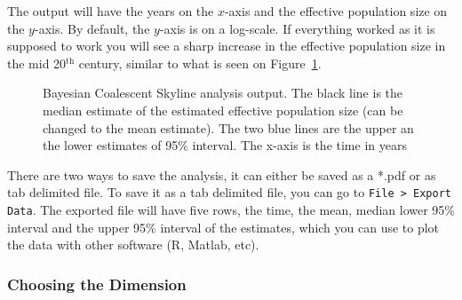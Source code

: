 \documentclass[11pt]{article}
\newcommand{\fixme}[1]{\textcolor{red}{\texttt{{\bf FIX ME:} #1}}}
\begin{document}
The output will have the years on the $x$-axis and the effective population size on the $y$-axis. By default, the $y$-axis is on a log-scale. If everything worked as it is supposed to work you will see a sharp increase in the effective population size in the mid 20$^{\mathrm{th}}$ century, similar to what is seen on Figure~\ref{fig:skyline}.


\begin{figure}[h!]
\centering
{}
\caption{\small Bayesian Coalescent Skyline analysis output. The black line is the median estimate of the estimated effective population size (can be changed to the mean estimate). The two blue lines are the upper an the lower estimates of 95$\%$ interval. The x-axis is the time in years}
\label{fig:skyline}
\end{figure}

There are two ways to save the analysis, it can either be saved as a *.pdf or as tab delimited file. To save it as a tab delimited file, you can go to \texttt{File > Export Data}. The exported file will have five rows, the time, the mean, median lower 95$\%$ interval and the upper 95$\%$ interval of the estimates, which you can use to plot the data with other software (R, Matlab, etc).


\bigskip
\subsubsection{Choosing the Dimension}
\end{document}
